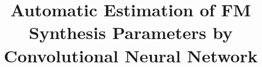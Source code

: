 \documentclass[sigconf,natbib=false]{acmart}
\begin{document}
\title{Automatic Estimation of FM Synthesis Parameters by Convolutional Neural Network}






\author{}
\end{document}
